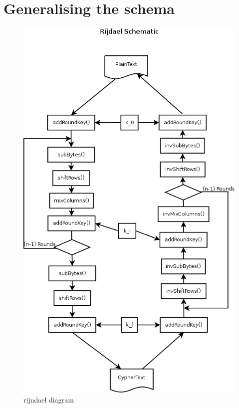 \documentclass[10pt,a4paper,twoside]{llncs}
\begin{document}
\section{Generalising the schema}\label{sec:generalising}

\begin{figure}[h!]
 \centering
 \includegraphics[scale=0.3,keepaspectratio=true]{./images/rijndaelDiagram.png}
 \caption{rijndael diagram}
 \label{fig:RijndaelDiagram}
\end{figure}
\end{document}
